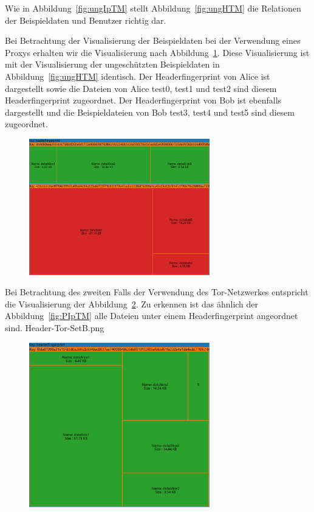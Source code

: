 \documentclass[
    fontsize=12pt,
    headings=small,
    parskip=half,           %
    bibliography=totoc,
    numbers=noenddot,       %
    open=any,               %
    ]{scrreprt}
\begin{document}
Wie in Abbildung~\ref{fig:ungIpTM} stellt Abbildung~\ref{fig:ungHTM} die Relationen der Beispieldaten und Benutzer richtig dar. 

Bei Betrachtung der Visualisierung der Beispieldaten bei der Verwendung eines Proxys erhalten wir die Visualisierung nach Abbildung~\ref{fig:PHTM}.
Diese Visualisierung ist mit der Visualisierung der ungeschützten Beispieldaten in Abbildung~\ref{fig:ungHTM} identisch. 
Der Headerfingerprint von Alice ist dargestellt sowie die Dateien von Alice test0, test1 und test2 sind diesem Headerfingerprint zugeordnet.
Der Headerfingerprint von Bob ist ebenfalls dargestellt und die Beispieldateien von Bob test3, test4 und test5 sind diesem zugeordnet.

\begin{figure}[H]
\includegraphics[width=0.7\textwidth]{../pic/Header-Proxy-SetA.PNG}
\label{fig:PHTM}
\end{figure}

Bei Betrachtung des zweiten Falls der Verwendung des Tor-Netzwerkes entspricht die Visualisierung der Abbildung~\ref{fig:THTM}.
Zu erkennen ist das ähnlich der Abbildung~\ref{fig:PIpTM} alle Dateien unter einem Headerfingerprint angeordnet sind.
Header-Tor-SetB.png
\begin{figure}[H]
\includegraphics[width=0.7\textwidth]{../pic/Header-Tor-SetB.png}
\label{fig:THTM}
\end{figure}
\end{document}
